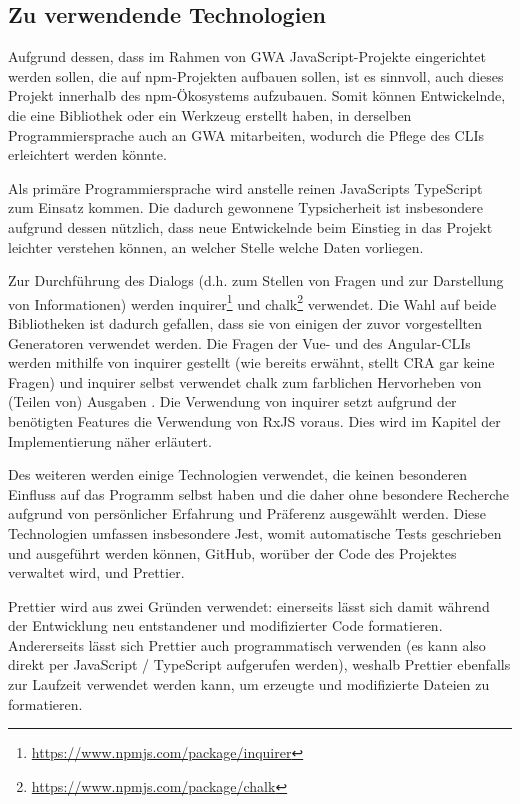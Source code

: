 \subsection{Zu verwendende Technologien}
Aufgrund dessen, dass im Rahmen von \gls{GWA} JavaScript-Projekte eingerichtet werden sollen, die auf \gls{npm}-Projekten aufbauen sollen, ist es sinnvoll, auch dieses Projekt innerhalb des \gls{npm}-Ökosystems aufzubauen. Somit können Entwickelnde, die eine Bibliothek oder ein Werkzeug erstellt haben, in derselben Programmiersprache auch an \gls{GWA} mitarbeiten, wodurch die Pflege des \gls{CLI}s erleichtert werden könnte.

Als primäre Programmiersprache wird anstelle reinen JavaScripts TypeScript zum Einsatz kommen. Die dadurch gewonnene Typsicherheit ist insbesondere aufgrund dessen nützlich, dass neue Entwickelnde beim Einstieg in das Projekt leichter verstehen können, an welcher Stelle welche Daten vorliegen.

Zur Durchführung des Dialogs (d.h. zum Stellen von Fragen und zur Darstellung von Informationen) werden inquirer\footnote{\url{https://www.npmjs.com/package/inquirer}} und chalk\footnote{\url{https://www.npmjs.com/package/chalk}} verwendet. Die Wahl auf beide Bibliotheken ist dadurch gefallen, dass sie von einigen der zuvor vorgestellten Generatoren verwendet werden. Die Fragen der Vue- und des Angular-\gls{CLI}s werden mithilfe von inquirer gestellt \cite{vue_cli_uses_inquirer} \cite{angular_cli_uses_inquirer} (wie bereits erwähnt, stellt \gls{CRA} gar keine Fragen) und inquirer selbst verwendet chalk zum farblichen Hervorheben von (Teilen von) Ausgaben \cite{inquirer_uses_chalk}. Die Verwendung von inquirer setzt aufgrund der benötigten Features die Verwendung von RxJS voraus. Dies wird im Kapitel der Implementierung näher erläutert.

Des weiteren werden einige Technologien verwendet, die keinen besonderen Einfluss auf das Programm selbst haben und die daher ohne besondere Recherche aufgrund von persönlicher Erfahrung und Präferenz ausgewählt werden. Diese Technologien umfassen insbesondere Jest, womit automatische Tests geschrieben und ausgeführt werden können, GitHub, worüber der Code des Projektes verwaltet wird, und Prettier.

Prettier wird aus zwei Gründen verwendet: einerseits lässt sich damit während der Entwicklung neu entstandener und modifizierter Code formatieren. Andererseits lässt sich Prettier auch programmatisch verwenden (es kann also direkt per JavaScript / TypeScript aufgerufen werden), weshalb Prettier ebenfalls zur Laufzeit verwendet werden kann, um erzeugte und modifizierte Dateien zu formatieren.
